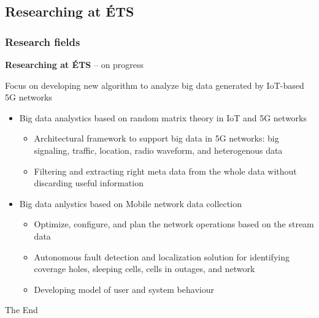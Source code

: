 \documentclass{beamer}
\begin{document}
\subsection{Researching at \'ETS}
\begin{frame}[fragile] %
\frametitle{Research fields}

\textbf{Researching at \'ETS} -- on progress
\begin{flushleft}
	Focus on developing new algorithm to analyze big data generated by IoT-based 5G networks\\
	\begin{itemize}
		\item Big data analystics based on random matrix theory in  IoT and 5G networks
			\begin{itemize}
		\item Architectural framework to support big data in 5G networks: big signaling, traffic, location, radio waveform, and heterogenous data
		\item Filtering and extracting right meta data from the whole data without discarding useful information
	\end{itemize}
	\item Big data anlystics based on Mobile network data collection
	\begin{itemize}
		\item Optimize, configure, and plan the network operations based on the stream data
		\item Autonomous fault detection and localization solution for identifying coverage holes, sleeping cells, cells in outages, and network
		\item Developing model of user and system behaviour
		
		
	\end{itemize}

	\end{itemize}
\end{flushleft}







\end{frame}
\begin{frame}
\Huge{\centerline{The End}}
\end{frame}

\end{document}
